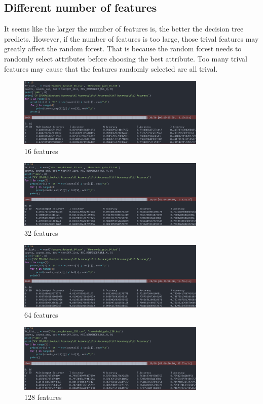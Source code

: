 \documentclass[UTF8, a4paper, 11pt]{article}
\begin{document}
\subsection{Different number of features}
It seems like the larger the number of features is, the better the decision tree predicts.
However, if the number of features is too large, those trival features may greatly affect the random forest.
That is because the random forest needs to randomly select attributes before choosing the best attribute.
Too many trival features may cause that the features randomly selected are all trival.
\begin{figure}[H]
    \centering
    \includegraphics[width=0.8\textwidth]{16_16_gain.png}
    \caption{16 features}
\end{figure}
\begin{figure}[H]
    \centering
    \includegraphics[width=0.8\textwidth]{32_16_gain.png}
    \caption{32 features}
\end{figure}
\begin{figure}[H]
    \centering
    \includegraphics[width=0.8\textwidth]{64_16_gain.png}
    \caption{64 features}
\end{figure}
\begin{figure}[H]
    \centering
    \includegraphics[width=0.8\textwidth]{128_16_gain.png}
    \caption{128 features}
\end{figure}
\end{document}
